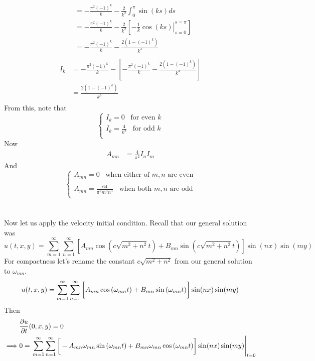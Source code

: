 \documentclass[12pt]{article}
\begin{document}
{\begin{align*}
&= -\frac{\pi^2 (-1)^k}{k} - \frac{2}{k^2}  \int_0^{\pi} \sin(ks) ds \\
&= -\frac{\pi^2 (-1)^k}{k} - \frac{2}{k^2} \left[ \left. -\frac{1}{k} \cos(ks) \right|_{s=0}^{s=\pi}  \right]  \\
&= -\frac{\pi^2 (-1)^k}{k} - \frac{2 (1 - (-1)^k ) }{k^3} \\
\end{align*}
\begin{align*}
I_k &= -\frac{\pi^2 (-1)^k}{k} - \left[ -\frac{\pi^2 (-1)^k}{k} - \frac{2 (1 - (-1)^k ) }{k^3} \right] \\
&= \frac{2 (1 - (-1)^k ) }{k^3} \\
\end{align*}
From this, note that
$$\begin{cases}
I_k = 0 \;\;\; \text{for even $k$}\\
I_k = \frac{4}{k^3} \;\;\; \text{for odd $k$}\\
\end{cases}$$
Now
\begin{align*}
A_{mn} &= \frac{4}{\pi^2} I_n I_m
\end{align*}
And
$$\begin{cases}
\displaystyle A_{mn} = 0 \;\;\; \text{when either of $m,n$ are even}\\
\\[-10pt]
\displaystyle A_{mn} = \frac{64}{\pi^2 m^3 n^3} \;\;\; \text{when both $m,n$ are odd}\\
\end{cases}$$ \\ \\
Now let us apply the velocity initial condition. Recall that our general solution was
$$u(t,x,y) = \sum_{m = 1}^{\infty} \sum_{n = 1}^{\infty} \left[ A_{mn} \cos \left(c \sqrt{m^2 + n^2} t \right) + B_{mn} \sin \left( c \sqrt{m^2 + n^2} t \right) \right] \sin(nx) \sin(my)$$
For compactness let's rename the constant $c\sqrt{m^2 + n^2}$ from our general solution to $\omega_{mn}$.
$$u(t,x,y) = \sum_{m = 1}^{\infty} \sum_{n = 1}^{\infty} \left[ \vphantom{\frac{1}{1}} A_{mn} \cos \left(\omega_{mn} t \right) + B_{mn} \sin \left( \omega_{mn} t \right) \right] \sin(nx) \sin(my)$$
Then
\begin{align*}
& \frac{\partial u}{\partial t}(0,x,y) = 0 \\
\implies& 0 =  \left. \sum_{m = 1}^{\infty} \sum_{n = 1}^{\infty} \left[  \vphantom{\frac{1}{1}} -A_{mn} \omega_{mn} \sin \left(\omega_{mn} t \right) + B_{mn} \omega_{mn} \cos \left( \omega_{mn} t \right) \right] \sin(nx) \sin(my) \right|_{t=0} \\

\end{align*}}
\end{document}
